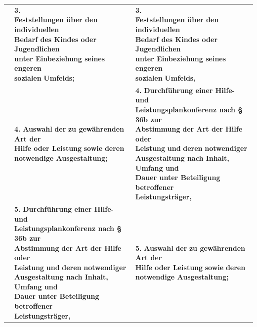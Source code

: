 \documentclass[10pt,a4paper,landscape]{article}
\begin{document}
\begin{longtable}{|L{8.2cm}|L{8.2cm}|L{8.2cm}|}
\hhline{|---|}
 & \textbf{3.   \newline Feststellungen über den individuellen  \newline Bedarf des Kindes oder Jugendlichen  \newline unter Einbeziehung seines engeren  \newline sozialen }\textbf{\textcolor{diffred}{Umfelds;}} & \textbf{3.   \newline Feststellungen über den individuellen  \newline Bedarf des Kindes oder Jugendlichen  \newline unter Einbeziehung seines engeren  \newline sozialen }\textbf{\textcolor{diffgreen}{Umfelds,}} \\
\hhline{|---|}
 & \textbf{4.} \newline \textbf{\textcolor{diffred}{Auswahl}}\textbf{ der }\textbf{\textcolor{diffred}{zu gewährenden}}\textbf{ Art der  \newline Hilfe oder Leistung }\textbf{\textcolor{diffred}{sowie}}\textbf{ deren} \newline \textbf{\textcolor{diffred}{notwendige Ausgestaltung;}} & \textbf{4.} \newline \textbf{\textcolor{diffgreen}{Durchführung einer Hilfe- und  \newline Leistungsplankonferenz nach \S{} 36b zur  \newline Abstimmung}}\textbf{ der Art der Hilfe oder  \newline Leistung }\textbf{\textcolor{diffgreen}{und}}\textbf{ deren }\textbf{\textcolor{diffgreen}{notwendiger  \newline Ausgestaltung nach Inhalt, Umfang und  \newline Dauer unter Beteiligung betroffener  \newline Leistungsträger,}} \\
\hhline{|---|}
 & \textbf{5.} \newline \textbf{\textcolor{diffred}{Durchführung einer Hilfe- und  \newline Leistungsplankonferenz nach \S{} 36b zur  \newline Abstimmung}}\textbf{ der Art der Hilfe oder  \newline Leistung }\textbf{\textcolor{diffred}{und}}\textbf{ deren }\textbf{\textcolor{diffred}{notwendiger  \newline Ausgestaltung nach Inhalt, Umfang und  \newline Dauer unter Beteiligung betroffener  \newline Leistungsträger,}} & \textbf{5.} \newline \textbf{\textcolor{diffgreen}{Auswahl}}\textbf{ der }\textbf{\textcolor{diffgreen}{zu gewährenden}}\textbf{ Art der  \newline Hilfe oder Leistung }\textbf{\textcolor{diffgreen}{sowie}}\textbf{ deren} \newline \textbf{\textcolor{diffgreen}{notwendige Ausgestaltung;}} \\

\end{longtable}
\end{document}
